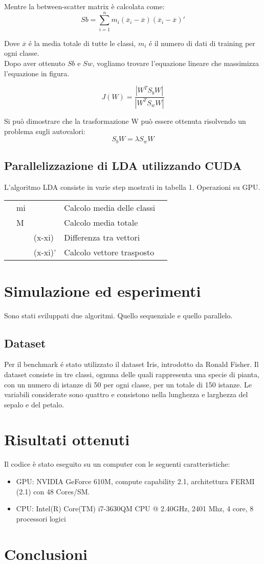 \documentclass[twocolumn]{article}
\begin{document}
Mentre la between-scatter matrix è calcolata come:
\[Sb = \sum_{i=1}^{n}m_{i}(\overline{x}_{i}-\overline{x})(\overline{x}_{i}-\overline{x})'\]

Dove \(\overline{x}\) \'e la media totale di tutte le classi, \(m_{i}\) \'e il numero di dati di training per ogni classe.\\
Dopo aver ottenuto \(Sb\) e \(Sw\), vogliamo trovare l'equazione lineare che massimizza l'equazione in figura.

\[J(W) = \frac{|W^{T} S_{b}  W|}{|W^{T} S_{w} W|}\]

Si può dimostrare che la trasformazione W può essere ottenuta risolvendo un problema sugli autovalori:
\[S_{b}W = \lambda S_{w}W\]

\subsection{Parallelizzazione di LDA utilizzando CUDA}
L'algoritmo LDA consiste in varie step mostrati in tabella 1.
Operazioni su GPU.
\begin{table}[]
	\begin{tabular}{lllll}
		& mi  &  & Calcolo media delle classi &  \\
		& M &  & Calcolo media totale &  \\
		&  & (x-xi) & Differenza tra vettori &  \\
		&  & (x-xi)' &  Calcolo vettore trasposto & 
	\end{tabular}
\end{table}

 
\section{Simulazione ed esperimenti}
Sono stati sviluppati due algoritmi. Quello sequenziale e quello parallelo.
\subsection{Dataset}
Per il benchmark \'e stato utilizzato il dataset Iris, introdotto da Ronald Fisher. Il dataset consiste in tre classi, ognuna delle quali rappresenta una specie di pianta, con un numero di istanze di 50 per ogni classe, per un totale di 150 istanze.
Le variabili considerate sono quattro e consistono nella lunghezza e larghezza del sepalo e del petalo.
\section{Risultati ottenuti}
Il codice è stato eseguito su un computer con le seguenti caratteristiche:
\begin{itemize}
	\item GPU: NVIDIA GeForce 610M, compute capability  2.1, architettura FERMI (2.1) con 48 Cores/SM.
	\item CPU: Intel(R) Core(TM) i7-3630QM CPU @ 2.40GHz, 2401 Mhz, 4 core, 8 processori logici
\end{itemize}
 



\section{Conclusioni}
\lipsum[1-2]
\end{document}
